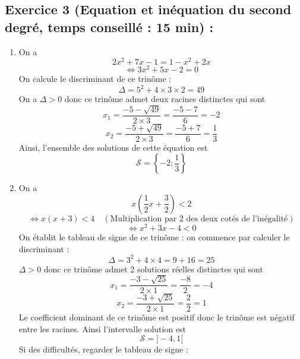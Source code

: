 \subsection*{Exercice 3 (Equation et inéquation du second degré, temps conseillé : 15 min) : }
\begin{enumerate}
\item On a 
$$2x^2 + 7 x -1 = 1 - x^2 + 2x$$
$$\Leftrightarrow 3x^2 +5x -2 = 0$$ 
On calcule le discriminant de ce trinôme : 
$$\Delta = 5^2 + 4\times 3 \times 2 = 49$$
On a $\Delta > 0$ donc ce trinôme admet deux racines distinctes qui sont
$$x_1 = \frac{-5 - \sqrt{49}}{2\times 3} = \frac{-5-7}{6} = -2$$
$$x_2 = \frac{-5 + \sqrt{49}}{2\times 3} = \frac{-5+7}{6} = \frac{1}{3}$$
Ainsi, l'ensemble des solutions de cette équation est 
$$\boxed{\mathcal{S} = \left\{-2;\frac{1}{3}\right\}}$$
\item On a
$$x\left(\frac{1}{2}x + \frac{3}{2}\right) < 2$$
$$\Leftrightarrow x\left(x + 3\right) < 4\quad (\text{Multiplication par 2 des deux cotés de l'inégalité})$$
$$\Leftrightarrow x^2 + 3x -4 < 0$$
On établit le tableau de signe de ce trinôme : on commence par calculer le discriminant : 
$$\Delta = 3^2 +4\times 4 = 9 +16 = 25$$
$\Delta > 0$ donc ce trinôme admet 2 solutions réelles distinctes qui sont 
$$x_1 = \frac{-3-\sqrt{25}}{2\times1} = \frac{-8}{2} = -4$$
$$x_2 = \frac{-3+\sqrt{25}}{2\times1} = \frac{2}{2} = 1$$
Le coefficient dominant de ce trinôme est positif donc le trinôme est négatif entre les racines. Ainsi l'intervalle solution est 
$$\boxed{\mathcal{S} = ]-4,1[}$$
Si des difficultés, regarder le tableau de signe : \newline

\end{enumerate}
